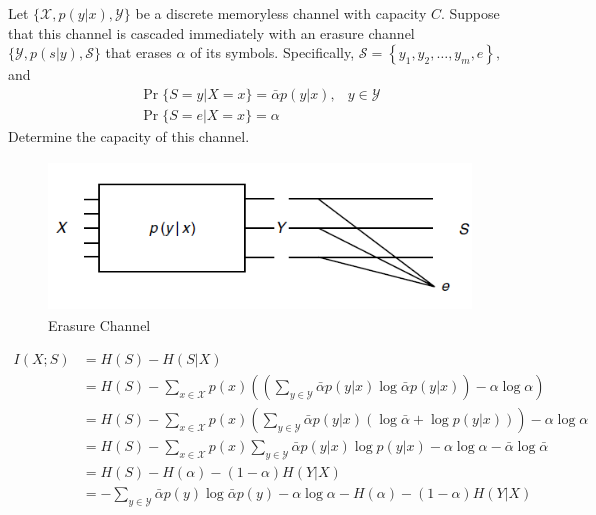 \begin{exercise}{Let $\{\mathcal{X}, p(y | x), \mathcal{Y}\}$ be a discrete memoryless channel with capacity $C$. Suppose that this channel is cascaded immediately with an erasure channel $\{\mathcal{Y}, p(s | y), \mathcal{S}\}$ that erases $\alpha$ of its symbols. Specifically, $\mathcal{S}=\left\{y_{1}, y_{2}, \ldots, y_{m}, e\right\},$ and
  $$
  \begin{array}{ll}
  \operatorname{Pr}\{S=y | X=x\}=\bar{\alpha} p(y | x), & y \in \mathcal{Y} \\
  \operatorname{Pr}\{S=e | X=x\}=\alpha
  \end{array}
  $$
  Determine the capacity of this channel.
  \begin{figure}[H]
    \centering
    \includegraphics[height=4cm]{img/7-1.png}
    \caption{Erasure Channel}
    \label{fig:ex5}
  \end{figure}
  }
  \begin{solution}
  \begin{equation}
    \begin{aligned}
      I(X;S) &= H(S) -H(S|X) \\
      &= H(S) - \sum_{x\in\mathcal{X}} p(x) \left( \left(\sum_{y\in\mathcal{Y}} \bar{\alpha} p(y|x) \log \bar{\alpha} p(y|x)\right) - \alpha \log \alpha \right) \\
      &= H(S) - \sum_{x\in\mathcal{X}} p(x) \left(\sum_{y\in\mathcal{Y}} \bar{\alpha} p(y|x) \left( \log \bar{\alpha} + \log p(y|x) \right)\right) - \alpha \log \alpha  \\
      &= H(S) - \sum_{x\in\mathcal{X}} p(x) \sum_{y\in\mathcal{Y}} \bar{\alpha} p(y|x)  \log p(y|x) - \alpha \log \alpha - \bar{\alpha} \log \bar{\alpha} \\
      &= H(S) - H(\alpha) -  (1-\alpha) H(Y|X) \\
      &= - \sum_{y\in\mathcal{Y}} \bar{\alpha}p(y) \log \bar{\alpha}p(y) - \alpha\log\alpha - H(\alpha) -  (1-\alpha) H(Y|X) \\

\end{aligned}
\end{equation}
\end{solution}
\end{exercise}
